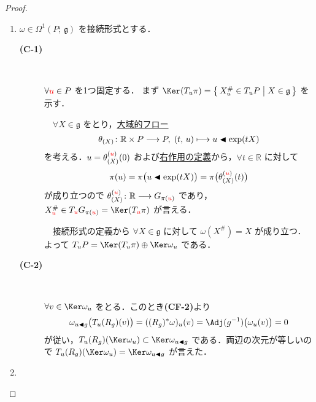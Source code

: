 \documentclass[TQFT_main]{subfiles}
\begin{document}
\begin{proof}
    \begin{enumerate}
        \item $\omega \in \Omega^1(P;\, \mathfrak{g})$ を接続形式とする．
        
        \begin{description}
            \item[\textbf{(C-1)}]　
            
            $\forall \textcolor{red}{u} \in P$ を1つ固定する．
            まず $\Ker (T_u \pi) = \bigl\{\, X^\#_u \in T_u P \bigm| X \in \mathfrak{g} \,\bigr\}$ を示す．
    
            　$\forall X \in \mathfrak{g}$ をとり，\hyperref[def:global-flow]{大域的フロー}
            \begin{align}
                \theta_{(X)} \colon \mathbb{R} \times P \longrightarrow P,\; (t,\, u) \longmapsto u \blacktriangleleft \exp(tX)
            \end{align}
            を考える．$u = \theta_{(X)}^{(\textcolor{red}{u})}(0)$ および\hyperref[prop.PFD_right]{右作用の定義}から，$\forall t\in \mathbb{R}$ に対して
            \begin{align}
                \pi (u) = \pi \bigl(u \blacktriangleleft \exp(tX)\bigr) = \pi \bigl( \theta_{(X)}^{(\textcolor{red}{u})}(t) \bigr) 
            \end{align}
            が成り立つので $\theta_{(X)}^{(\textcolor{red}{u})} \colon \mathbb{R} \longrightarrow G_{\pi(\textcolor{red}{u})}$ であり，$X^\#_{\textcolor{red}{u}} \in T_{\textcolor{red}{u}} G_{\pi(\textcolor{red}{u})} = \Ker (T_{\textcolor{red}{u}} \pi)$ が言える．
            
            　接続形式の定義から $\forall X \in \mathfrak{g}$ に対して $\omega (X^\#) = X$ が成り立つ．よって $T_u P = \Ker (T_u\pi) \oplus \Ker \omega_u$ である．
    
            \item[\textbf{(C-2)}]　
            
            $\forall v \in \Ker \omega_u$ をとる．このとき\textbf{\textsf{(CF-2)}}より
            \begin{align}
                \omega_{u \btl g} \bigl( T_u(R_g)(v) \bigr) = ((R_g)^* \omega)_u (v) = \Adj (g^{-1})\bigl(\omega_u(v)\bigr) = 0
            \end{align}
            が従い，$T_u(R_g)(\Ker \omega_u) \subset \Ker \omega_{u \btl g}$ である．両辺の次元が等しいので $T_u(R_g)(\Ker \omega_u) = \Ker \omega_{u \btl g}$ が言えた．
        \end{description}

        \item 
    \end{enumerate}
\end{proof}
\end{document}
